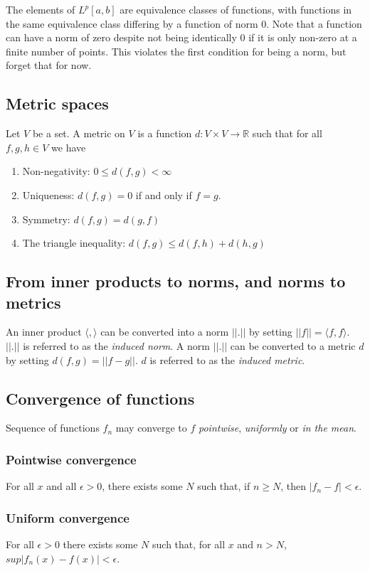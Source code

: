 \documentclass[]{article}
\begin{document}
The elements of $L^{p}[a,b]$ are equivalence classes of functions, with functions in the same equivalence class differing by a function of norm $0$. Note that a function can have a norm of zero despite not being identically 0 if it is only non-zero at a finite number of points. This violates the first condition for being a norm, but forget that for now.
\subsection{Metric spaces}
Let $V$ be a set. A metric on $V$ is a function $d: V \times V \longrightarrow \mathbb{R}$ such that for all $f,g,h \in V$ we have
\begin{enumerate}
	\item Non-negativity: $ 0 \leq d(f,g) < \infty $
	\item Uniqueness: $d(f,g) = 0$ if and only if $f=g$.
	\item Symmetry: $d(f,g) = d(g,f)$
	\item The triangle inequality: $d(f,g) \leq d(f,h) + d(h,g)$
\end{enumerate}
\subsection{From inner products to norms, and norms to metrics}
An inner product $\langle,\rangle$ can be converted into a norm $||.||$ by setting $||f|| = \langle f,f \rangle$. $||.||$ is referred to as the \textit{induced norm}.
\newline
\newline
A norm $||.||$ can be converted to a metric $d$ by setting $d(f,g) = ||f-g||$. $d$ is referred to as the \textit{induced metric}.
\subsection{Convergence of functions}
Sequence of functions $f_{n}$ may converge to $f$ \textit{pointwise}, \textit{uniformly} or \textit{in the mean}.
\subsubsection{Pointwise convergence}
For all $x$ and all $\epsilon > 0$, there exists some $N$ such that, if $n \geq N$, then $|f_{n} - f| < \epsilon$. 
\subsubsection{Uniform convergence}
For all $\epsilon > 0$ there exists some $N$ such that, for all $x$ and $n > N$, $sup|f_{n}(x) - f(x)| < \epsilon$.
\end{document}

